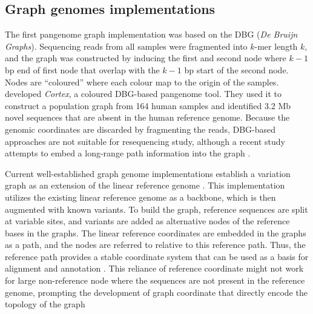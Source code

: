 \documentclass[../main.tex]{subfiles}
\begin{document}
\subsection*{Graph genomes implementations}

The first pangenome graph implementation was based on the DBG (\emph{De Bruijn Graphs}). Sequencing reads from all samples were fragmented into $k$-mer length $k$, and the graph was constructed by inducing the first and second node where $k-1$ bp end of first node that overlap with the $k-1$ bp start of the second node. Nodes are “coloured” where each colour map to the origin of the samples. \citet{iqbal2012novo} developed \emph{Cortex}, a coloured DBG-based pangenome tool. They used it to construct a population graph from 164 human samples and identified 3.2 Mb novel sequences that are absent in the human reference genome. Because the genomic coordinates are discarded by fragmenting the reads, DBG-based approaches are not suitable for resequencing study, although a recent study attempts to embed a long-range path information into the graph \citep{turner2018integrating}. 

Current well-established graph genome implementations establish a variation graph as an extension of the linear reference genome \citep{eggertsson2017graphtyper,garrison2018variation,sibbesen2018accurate,rakocevic2019fast,kim2019graph}. This implementation utilizes the existing linear reference genome as a backbone, which is then augmented with known variants. To build the graph, reference sequences are split at variable sites, and variants are added as alternative nodes of the reference bases in the graphs. The linear reference coordinates are embedded in the graphs as a path, and the nodes are referred to relative to this reference path. Thus, the reference path provides a stable coordinate system that can be used as a basis for alignment and annotation \citep{garrison2018variation}. This reliance of reference coordinate might not work for large non-reference node where the sequences are not present in the reference genome, prompting the development of graph coordinate that directly encode the topology of the graph \citep{paten2017genome,eizenga2020pangenome} 
\end{document}
